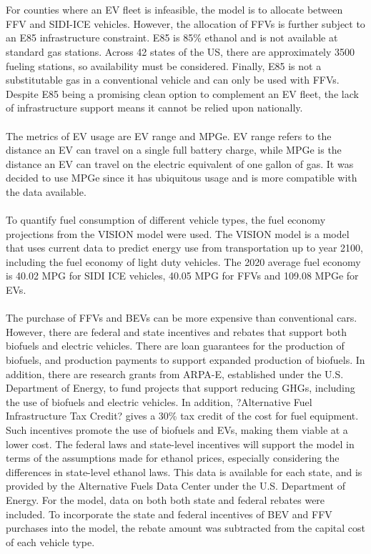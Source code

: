 \documentclass[answers]{exam}
\begin{document}
\\ ~\\
For counties where an EV fleet is infeasible, the model is to allocate between FFV and SIDI-ICE vehicles. However, the allocation of FFVs is further subject to an E85 infrastructure constraint. E85 is 85\% ethanol and is not available at standard gas stations. Across 42 states of the US, there are approximately 3500 fueling stations, so availability must be considered. Finally, E85 is not a substitutable gas in a conventional vehicle and can only be used with FFVs. Despite E85 being a promising clean option to complement an EV fleet, the lack of infrastructure support means it cannot be relied upon nationally.
\\ ~\\
The metrics of EV usage are EV range and MPGe. EV range refers to the distance an EV can travel on a single full battery charge, while MPGe is the distance an EV can travel on the electric equivalent of one gallon of gas. It was decided to use MPGe since it has ubiquitous usage and is more compatible with the data available.
\\ ~\\
To quantify fuel consumption of different vehicle types, the fuel economy projections from the VISION model\cite{vision} were used. The VISION model is a model that uses current data to predict energy use from transportation up to year 2100, including the fuel economy of light duty vehicles. The 2020 average fuel economy is 40.02 MPG for SIDI ICE vehicles, 40.05 MPG for FFVs and 109.08 MPGe for EVs.  
\\ ~\\
The purchase of FFVs and BEVs can be more expensive than conventional cars. However, there are federal and state incentives and rebates that support both biofuels and electric vehicles\cite{state and federal incentives}. There are loan guarantees for the production of biofuels, and production payments to support expanded production of biofuels. In addition, there are research grants from ARPA-E, established under the U.S. Department of Energy, to fund projects that support reducing GHGs, including the use of biofuels and electric vehicles. In addition, ?Alternative Fuel Infrastructure Tax Credit? gives a 30\% tax credit of the cost for fuel equipment. Such incentives promote the use of biofuels and EVs, making them viable at a lower cost. The federal laws and state-level incentives will support the model in terms of the assumptions made for ethanol prices, especially considering the differences in state-level ethanol laws. This data is available for each state, and is provided by the Alternative Fuels Data Center under the U.S. Department of Energy\cite{ethanol laws}. For the model, data on both both state and federal rebates were included. To incorporate the state and federal incentives of BEV and FFV purchases into the model, the rebate amount was subtracted from the capital cost of each vehicle type. 
\end{document}
